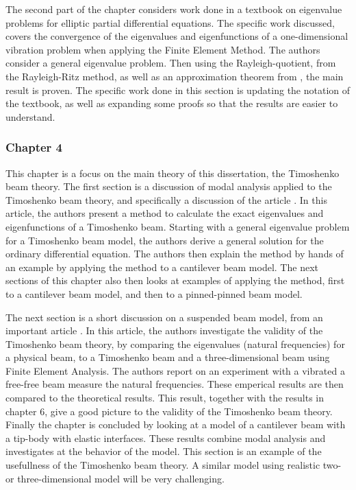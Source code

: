 \documentclass[../main.tex]{subfiles}
\begin{document}
The second part of the chapter considers work done in a textbook \cite{SF97} on eigenvalue problems for elliptic partial differential equations. The specific work discussed, covers the convergence of the eigenvalues and eigenfunctions of a one-dimensional vibration problem when applying the Finite Element Method. The authors consider a general eigenvalue problem. Then using the Rayleigh-quotient, from the Rayleigh-Ritz method, as well as an approximation theorem from \cite{OR97}, the main result is proven. The specific work done in this section is updating the notation of the textbook, as well as expanding some proofs so that the results are easier to understand.

\subsubsection{Chapter 4}
This chapter is a focus on the main theory of this dissertation, the Timoshenko beam theory. The first section is a discussion of modal analysis applied to the Timoshenko beam theory, and specifically a discussion of the article \cite{VV06}. In this article, the authors present a method to calculate the exact eigenvalues and eigenfunctions of a Timoshenko beam. Starting with a general eigenvalue problem for a Timoshenko beam model, the authors derive a general solution for the ordinary differential equation. The authors then explain the method by hands of an example by applying the method to a cantilever beam model. The next sections of this chapter also then looks at examples of applying the method, first to a cantilever beam model, and then to a pinned-pinned beam model.

The next section is a short discussion on a suspended beam model, from an important article \cite{SP06}. In this article, the authors investigate the validity of the Timoshenko beam theory, by comparing the eigenvalues (natural frequencies) for a physical beam, to a Timoshenko beam and a three-dimensional beam using Finite Element Analysis. The authors report on an experiment with a vibrated a free-free beam measure the natural frequencies. These emperical results are then compared to the theoretical results. This result, together with the results in chapter 6, give a good picture to the validity of the Timoshenko beam theory. Finally the chapter is concluded by looking at a model of a cantilever beam with a tip-body with elastic interfaces. These results combine modal analysis and investigates at the behavior of the model. This section is an example of the usefullness of the Timoshenko beam theory. A similar model using realistic two- or three-dimensional model will be very challenging.
\end{document}
